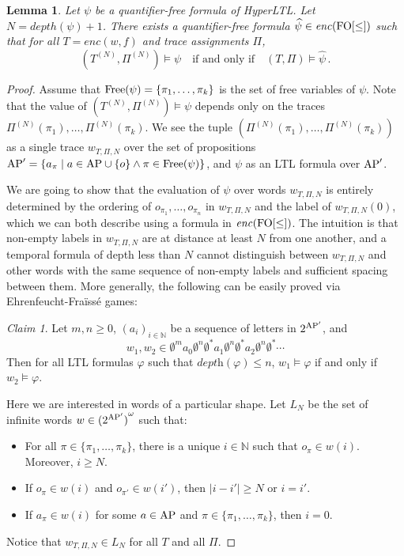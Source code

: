 \documentclass[dvipsnames,10pt,a4paper]{amsart}
\newtheorem{lem}[thm]{Lemma}
\theoremstyle{definition}
\theoremstyle{remark}
\newtheorem{clm}{Claim}
\newcommand{\set}[1]{\{#1\}}
\newcommand{\nats}{\mathbb{N}}
\newcommand\Nat{\nats}
\newcommand{\hyltl}{{HyperLTL}\xspace}
\newcommand\FO{\textup{FO}}
\newcommand\simpleHyperLTL{\encPhi {\FOw}}
\newcommand\AP{\textup{AP}}
\newcommand\Free{\textup{Free}}
\newcommand\depth{\textit{depth}}
\newcommand\FOw{\FO[\le]}
\newcommand\enc[2]{\mathit{enc}(#1,#2)}
\newcommand\tn[2]{#1^{(#2)}}
\newcommand\nun[2]{#1^{(#2)}}
\newcommand\encPhi[1]{\mathit{enc}(#1)}
\newcommand\simpl[1]{\widehat {#1}}
\begin{document}
\begin{lem}\label{lem:QFsimpl}
  Let $\psi$ be a quantifier-free formula of \hyltl.
  Let $N = \mathit{depth}(\psi)+1$.
  There exists a quantifier-free formula $\simpl \psi \in \simpleHyperLTL$
  such that for all $T = \enc w f$ and trace assignments $\Pi$,
  \[
    (\tn T N, \nun \Pi N) \models \psi \quad\text{if and only if}\quad (T,\Pi) \models \simpl \psi
     \, .
  \]
\end{lem}

\begin{proof} 
  Assume that $\Free(\psi) = \{\pi_1, \ldots, \pi_k\}$ is the set of free variables of $\psi$.
  Note that the value of $(\tn T N, \nun \Pi N) \models \psi$ depends
  only on the traces $\nun \Pi N(\pi_1),\ldots,\nun \Pi N(\pi_k)$.
  We see the tuple $(\nun \Pi N(\pi_1),\ldots,\nun \Pi N(\pi_k))$ as a single
  trace $w_{T,\Pi,N}$ over the set of propositions
  $\AP' = \{a_{\pi} \mid a \in \AP\cup\set{o} \land \pi \in \Free(\psi)\}$,
  and $\psi$ as an LTL formula over $\AP'$.
  
  We are going to show that the evaluation of $\psi$ over words $w_{T,\Pi,N}$ is
  entirely determined by the ordering of $o_{\pi_1}, \ldots, o_{\pi_n}$ in
  $w_{T,\Pi,N}$ and the label of $w_{T,\Pi,N}(0)$, which we can both
  describe using a formula in $\simpleHyperLTL$.
  The intuition is that non-empty labels in $w_{T,\Pi,N}$ are
  at distance at least $N$ from one another, and  a temporal formula of depth
  less than $N$ cannot distinguish between $w_{T,\Pi,N}$ and other words
  with the same sequence of non-empty labels and sufficient spacing between
  them.
  More generally, the following can be easily proved via
  Ehrenfeucht-Fra\"iss\'e games:

  \begin{clm}\label{claim:EF}
    Let $m,n \ge 0$, $(a_i)_{i \in \Nat}$ be a sequence of letters in
    $2^{\AP'}$, and
    \[
      w_1, w_2 \in
      \emptyset^m a_0 \emptyset^{n}\emptyset^\ast
      a_1 \emptyset^{n}\emptyset^\ast a_2 \emptyset^{n}\emptyset^\ast \cdots
    \]
    Then for all LTL formulas $\varphi$ such that $\depth(\varphi) \le n$,
    $w_1 \models \varphi$ if and only if $w_2 \models \varphi$.
  \end{clm}


  Here we are interested in words of a particular shape.
  Let $L_N$ be the set of infinite words $w \in {(2^{\AP'})}^\omega$ such that:
  \begin{itemize}
  \item For all $\pi \in \{\pi_1,\ldots,\pi_k\}$, there is a unique
    $i \in \Nat$ such that $o_{\pi} \in w(i)$. Moreover, $i \ge N$.
  \item If $o_{\pi} \in w(i)$ and $o_{\pi'} \in w(i') $,
    then $|i-i'| \ge N$ or $i = i'$.
  \item If $a_{\pi} \in w(i)$ for some $a \in \AP$ and
    $\pi \in \{\pi_1,\ldots,\pi_k\}$, then $i = 0$.
  \end{itemize}
  Notice that $w_{T,\Pi,N} \in L_N$ for all $T$ and all $\Pi$.
  

\end{proof}
\end{document}
